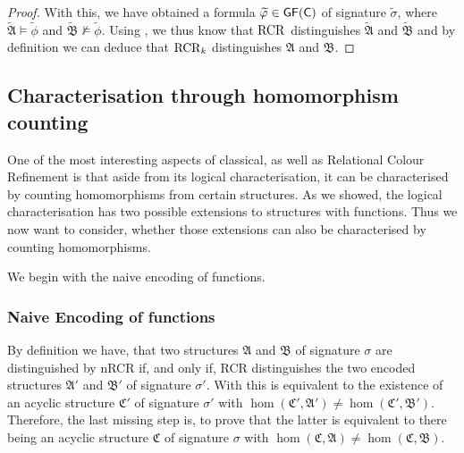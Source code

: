 \begin{proof}
	With this, we have obtained a formula $\widetilde{\varphi}\in\mathsf{GF}(\mathsf{C})$ of signature $\widetilde{\sigma}$, where $\widetilde{\mathfrak A}\models \widetilde{\phi}$ and $\widetilde{\mathfrak B}\not\models \widetilde{\phi}$.
	Using \cite{scheidt2025ColorRefinement}, we thus know that $\operatorname{RCR}$ distinguishes $\widetilde{\mathfrak A}$ and $\widetilde{\mathfrak B}$ and by definition we can deduce that $\operatorname{RCR}_k$ distinguishes $\mathfrak A$ and $\mathfrak B$.
\end{proof}



\subsection{Characterisation through homomorphism counting}

One of the most interesting aspects of classical, as well as Relational Colour Refinement is that aside from its logical characterisation, it can be characterised by counting homomorphisms from certain structures.
As we showed, the logical characterisation has two possible extensions to structures with functions.
Thus we now want to consider, whether those extensions can also be characterised by counting homomorphisms.

We begin with the naive encoding of functions.

\subsubsection{Naive Encoding of functions}

By definition we have, that two structures $\mathfrak A$ and $\mathfrak B$ of signature $\sigma$ are distinguished by nRCR if, and only if, RCR distinguishes the two encoded structures $\mathfrak A'$ and $\mathfrak B'$ of signature $\sigma'$.
With \cite{scheidt2025ColorRefinement} this is equivalent to the existence of an acyclic structure $\mathfrak C'$ of signature $\sigma'$ with $\hom(\mathfrak C',\mathfrak A')\neq \hom(\mathfrak C',\mathfrak B')$.
Therefore, the last missing step is, to prove that the latter is equivalent to there being an acyclic structure $\mathfrak C$ of signature $\sigma$ with $\hom(\mathfrak C,\mathfrak A)\neq\hom(\mathfrak C,\mathfrak B)$.

